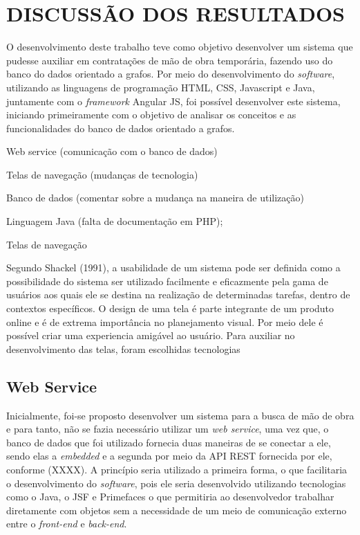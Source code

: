 
\chapter{DISCUSSÃO DOS RESULTADOS} 

\par O desenvolvimento deste trabalho teve como objetivo desenvolver um sistema que pudesse auxiliar em contratações de mão de obra temporária, fazendo uso do banco do dados orientado a grafos. Por meio do desenvolvimento do \textit{software}, utilizando as linguagens de programação HTML, CSS, Javascript e Java, juntamente com o \textit{framework} Angular JS, foi possível desenvolver este sistema, iniciando primeiramente com o objetivo de analisar os conceitos e as funcionalidades do banco de dados orientado a grafos.

\par Web service (comunicação com o banco de dados)
\par Telas de navegação (mudanças de tecnologia)
\par Banco de dados (comentar sobre a mudança na maneira de utilização)
\par Linguagem Java (falta de documentação em PHP);


\par Telas de navegação

\par Segundo Shackel (1991), a usabilidade de um sistema pode ser definida como a possibilidade do sistema ser utilizado facilmente e eficazmente pela gama de usuários aos quais ele se destina na realização de determinadas tarefas, dentro de contextos específicos.  O design de uma tela é parte integrante de um produto online e é de extrema importância no planejamento visual. Por meio dele é possível criar uma experiencia amigável ao usuário. Para auxiliar no desenvolvimento das telas, foram escolhidas tecnologias  


\section{Web Service}

\par Inicialmente, foi-se proposto desenvolver um sistema para a busca de mão de obra e para tanto, não se fazia necessário utilizar um \textit{web service}, uma vez que, o banco de dados que foi utilizado fornecia duas maneiras de se conectar a ele, sendo elas a \textit{embedded} e a segunda por meio da API REST fornecida por ele, conforme (XXXX). A princípio seria utilizado a primeira forma, o que facilitaria o desenvolvimento do \textit{software}, pois ele seria desenvolvido utilizando tecnologias como o Java, o JSF e Primefaces o que permitiria ao desenvolvedor trabalhar diretamente com objetos sem a necessidade de um meio de comunicação externo entre o \textit{front-end} e \textit{back-end}.

